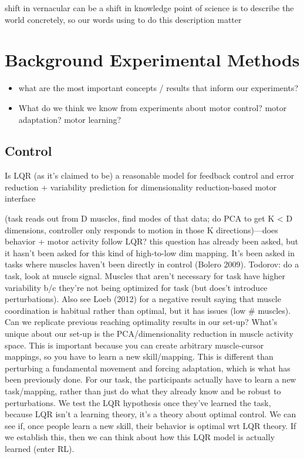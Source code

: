 \documentclass[
  a4paper,
]{article}
\providecommand{\tightlist}{%
  \setlength{\itemsep}{0pt}\setlength{\parskip}{0pt}}
\begin{document}
shift in vernacular can be a shift in knowledge point of science is to
describe the world concretely, so our words using to do this description
matter

\hypertarget{sec:experiment}{%
\section{Background Experimental Methods}\label{sec:experiment}}

\begin{itemize}
\tightlist
\item
  what are the most important concepts / results that inform our
  experiments?
\item
  What do we think we know from experiments about motor control? motor
  adaptation? motor learning?
\end{itemize}

\hypertarget{control}{%
\subsection{Control}\label{control}}

Is LQR (as it's claimed to be) a reasonable model for feedback control
and error reduction + variability prediction for dimensionality
reduction-based motor interface

(task reads out from D muscles, find modes of that data; do PCA to get K
\textless{} D dimensions, controller only responds to motion in those K
directions)---does behavior + motor activity follow LQR? this question
has already been asked, but it hasn't been asked for this kind of
high-to-low dim mapping. It's been asked in tasks where muscles haven't
been directly in control (Bolero 2009). Todorov: do a task, look at
muscle signal. Muscles that aren't necessary for task have higher
variability b/c they're not being optimized for task (but does't
introduce perturbations). Also see Loeb (2012) for a negative result
saying that muscle coordination is habitual rather than optimal, but it
has issues (low \# muscles). Can we replicate previous reaching
optimality results in our set-up? What's unique about our set-up is the
PCA/dimensionality reduction in muscle activity space. This is important
because you can create arbitrary muscle-cursor mappings, so you have to
learn a new skill/mapping. This is different than perturbing a
fundamental movement and forcing adaptation, which is what has been
previously done. For our task, the participants actually have to learn a
new task/mapping, rather than just do what they already know and be
robust to perturbations. We test the LQR hypothesis once they've learned
the task, because LQR isn't a learning theory, it's a theory about
optimal control. We can see if, once people learn a new skill, their
behavior is optimal wrt LQR theory. If we establish this, then we can
think about how this LQR model is actually learned (enter RL).
\end{document}
